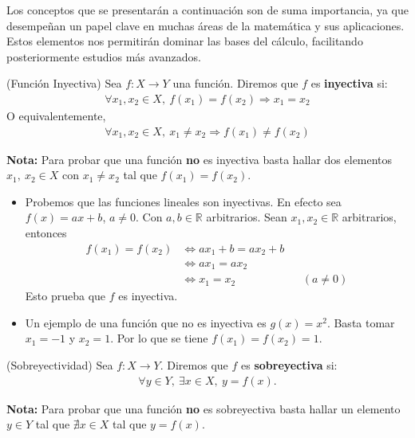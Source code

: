 \documentclass[12pt]{book}
\begin{document}
Los conceptos que se presentarán a continuación son de suma importancia, ya que desempeñan un papel clave en muchas áreas de la matemática y sus aplicaciones. Estos elementos nos permitirán dominar las bases del cálculo, facilitando posteriormente estudios más avanzados.
\begin{defi}{(Función Inyectiva)}{}
    Sea $f : X \longrightarrow Y$ una función. Diremos que $f$ es \textbf{inyectiva} si:
    \begin{align*}
        \forall x_1 , x_2 \in X,  \ f(x_1)=f(x_2) \Longrightarrow x_1 = x_2
    \end{align*}
    O equivalentemente,
    \begin{align*}
          \forall x_1 , x_2 \in X,  \ x_1\neq x_2 \Longrightarrow f(x_1)\neq f(x_2) 
    \end{align*}
\end{defi}
\textbf{Nota:} Para probar que una función \textbf{no} es inyectiva basta hallar dos elementos $x_1, \  x_2 \in X$ con $x_1 \neq x_2$ tal que $f(x_1)=f(x_2)$.
\begin{eje}{}{}
    \begin{itemize}
        \item Probemos que las funciones lineales son inyectivas. En efecto sea $f(x)=ax+b$, $a \neq 0$. Con $a,b \in \mathbb{R}$ arbitrarios. Sean $x_1, x_2 \in \mathbb{R}$ arbitrarios, entonces
    \begin{align*}
        f(x_1)=f(x_2) &\Longleftrightarrow ax_1+b=ax_2+b \\
         &\Longleftrightarrow ax_1=ax_2 \\
          &\Longleftrightarrow x_1 = x_2 && (a\neq 0)
    \end{align*}
    Esto prueba que $f$ es inyectiva.

    \item Un ejemplo de una función que no es inyectiva es $g(x)=x^2$. Basta tomar $x_1 = -1$ y $x_2=1$. Por lo que se tiene $f(x_1)=f(x_2)=1$.
    \end{itemize}
\end{eje}

\begin{defi}{(Sobreyectividad)}{}
    Sea $f : X \longrightarrow Y$. Diremos que $f$ es \textbf{sobreyectiva} si:
    \begin{align*}
        \forall y \in Y, \ \exists x \in X, \ y=f(x).
    \end{align*}
\end{defi}

\textbf{Nota:} Para probar que una función \textbf{no} es sobreyectiva basta hallar un elemento $y \in Y$ tal que $\nexists x \in X$ tal que $y=f(x)$.
\end{document}
